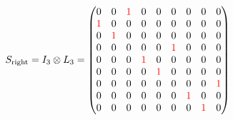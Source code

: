 \begin{align}
  S_{\text{right}} = I_3 \otimes L_3 =
  \begin{pmatrix}
    0                  & 0                  & \textcolor{red}{1} & 0                  & 0                  & 0                  & 0                  & 0                  & 0                  \\
    \textcolor{red}{1} & 0                  & 0                  & 0                  & 0                  & 0                  & 0                  & 0                  & 0                  \\
    0                  & \textcolor{red}{1} & 0                  & 0                  & 0                  & 0                  & 0                  & 0                  & 0                  \\
    0                  & 0                  & 0                  & 0                  & 0                  & \textcolor{red}{1} & 0                  & 0                  & 0                  \\
    0                  & 0                  & 0                  & \textcolor{red}{1} & 0                  & 0                  & 0                  & 0                  & 0                  \\
    0                  & 0                  & 0                  & 0                  & \textcolor{red}{1} & 0                  & 0                  & 0                  & 0                  \\
    0                  & 0                  & 0                  & 0                  & 0                  & 0                  & 0                  & 0                  & \textcolor{red}{1} \\
    0                  & 0                  & 0                  & 0                  & 0                  & 0                  & \textcolor{red}{1} & 0                  & 0                  \\
    0                  & 0                  & 0                  & 0                  & 0                  & 0                  & 0                  & \textcolor{red}{1} & 0
  \end{pmatrix}
\end{align}


